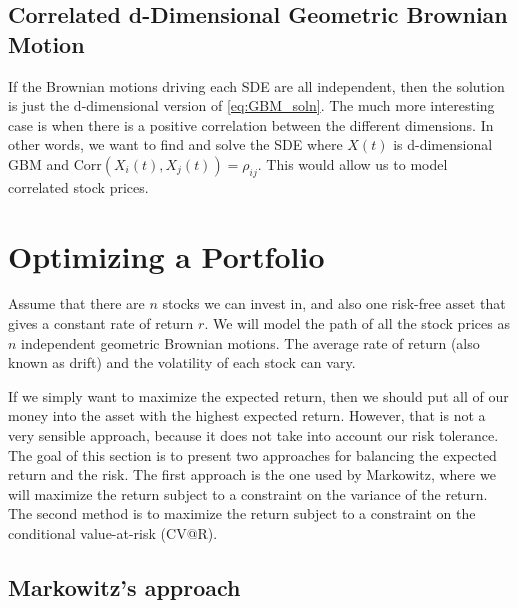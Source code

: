 \documentclass{amsart}
\theoremstyle{definition}
\theoremstyle{remark}
\begin{document}
\subsection{Correlated d-Dimensional Geometric Brownian Motion}
If the Brownian motions driving each SDE are all independent, then the solution is just the d-dimensional version of \eqref{eq:GBM_soln}. The much more interesting case is when there is a positive correlation between the different dimensions. In other words, we want to find and solve the SDE where $X(t)$ is d-dimensional GBM and $\text{Corr}(X_i(t), X_j(t)) = \rho_{ij}$. This would allow us to model correlated stock prices.

\section{Optimizing a Portfolio}
Assume that there are $n$ stocks we can invest in, and also one risk-free asset that gives a constant rate of return $r$. We will model the path of all the stock prices as $n$ independent geometric Brownian motions. The average rate of return (also known as drift) and the volatility of each stock can vary.

If we simply want to maximize the expected return, then we should put all of our money into the asset with the highest expected return. However, that is not a very sensible approach, because it does not take into account our risk tolerance. The goal of this section is to present two approaches for balancing the expected return and the risk. The first approach is the one used by Markowitz, where we will maximize the return subject to a constraint on the variance of the return. The second method is to maximize the return subject to a constraint on the conditional value-at-risk (CV@R).

\subsection{Markowitz's approach}
\end{document}
